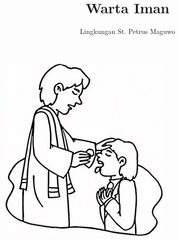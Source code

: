 \documentclass[a5paper,titlepage,10pt,openany]{scrbook}
\author{Lingkungan St. Petrus Maguwo}
\title{Warta Iman}
\begin{document}
\thispagestyle{empty}

\setlength{\parindent}{1cm}
\pagestyle{plain}


\begin{center}
\includegraphics[scale=0.5]{gambar/communion-in-church-coloring-page.jpg}
\end{center}






\end{document}
